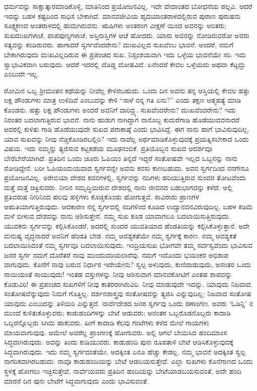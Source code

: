 ಧರ್ಮವನ್ನು ಸಾಕ್ಷಾತ್ಕಾರಮಾಡಿಕೊಳ್ಳಿ, ಮಾತಿನಿಂದ ಪ್ರಯೋಜನವಿಲ್ಲ. ಇದೇ ವೇದಾಂತದ ಬೋಧನೆಯ ಪಲ್ಲವಿ. ಆದರೆ ಇದನ್ನು ಬಹಳ ಕಷ್ಟದಿಂದ ಸಾಧಿಸ ಬೇಕಾಗಿದೆ. ಮಾನವಜೀವಿಯ ಹೃದಯಾಂತರಾಳದಲ್ಲಿರುವ ಪುರಾಣ ಪುರುಷನು ಸೂಕ್ಷ್ಮಕಣದ ಅಂತರಾಳದಲ್ಲಿ ಹುದುಗಿರುವನು. ಋಷಿಗಳು ಅಂತರಂಗ ವೀಕ್ಷಣೆ ಯಿಂದ ಅವನನ್ನು ಅರಿತರು; ಸುಖದುಃಖಗಳಾಚೆ, ಪಾಪಪುಣ್ಯಗಳಾಚೆ, ಅಸ್ತಿನಾಸ್ತಿಗಳ ಆಚೆ ಹೋದರು. ಯಾರು ಅವನನ್ನು ನೋಡಿರುವರೋ ಅವರು ಸತ್ಯವನ್ನು ಕಂಡಿರುವರು. ಹಾಗಾದರೆ ಸ್ವರ್ಗವೆಂದರೇನು? ದುಃಖವಿಲ್ಲದ ಸುಖವೆಂಬ ಭಾವನೆ. ಅಂದರೆ, ನಮಗೆ ಬೇಕಾಗಿರುವುದು ದುಃಖವಿಲ್ಲದಿರುವ ಈ ಪ್ರಪಂಚದ ಸುಖ. ನಿಸ್ಸಂಶಯವಾಗಿ ಇದು ಒಳ್ಳೆಯ ಭಾವನೆಯೇ ಸರಿ. ಇದು ಸ್ವಾಭಾವಿಕವಾಗಿ ಬರುವುದು. ಆದರೆ ಇದರಲ್ಲಿ ದೊಡ್ಡ ದೋಷವಿದೆ. ಏನೆಂದರೆ ಕೇವಲ ಒಳ್ಳೆಯದು ಅಥವಾ ಕೆಟ್ಟದ್ದು ಎಂಬುದೇ ಇಲ್ಲ.

ರೋಮಿನ ಒಬ್ಬ ಶ‍್ರೀಮಂತನ ಕಥೆಯನ್ನು ನೀವೆಲ್ಲ ಕೇಳಿರಬಹುದು. ಒಂದು ದಿನ ಅವನು ತನ್ನ ಆಸ್ತಿಯಲ್ಲಿ ಕೇವಲ ಹತ್ತು ಲಕ್ಷ ಪೌಂಡುಗಳು ಮಾತ್ರ ಉಳಿದಿವೆ ಎಂಬುದನ್ನು ಕೇಳಿ “ನಾಳೆ ನನ್ನ ಗತಿ ಏನು?” ಎಂದು ತಕ್ಷಣ ಆತ್ಮಹತ್ಯೆ ಮಾಡಿ ಕೊಂಡನು. ಹತ್ತು ಲಕ್ಷ ಪೌಂಡುಗಳು ಅಂದರೆ ಅವನಿಗೆ ದಾರಿದ್ರ್ಯ. ಸುಖವೆಂದರೇನು? ದುಃಖವೆಂದರೇನು? ಇದು ನಿರಂತರ ಬದಲಾಗುತ್ತಿರುವ ಭಾವನೆ. ನಾನು ಹುಡುಗ ನಾಗಿದ್ದಾಗ ನಾನೊಬ್ಬ ಕುದುರೆಗಾಡಿ ಹೊಡೆಯುವವನಾದರೆ ಅದರಲ್ಲಿ ಕುಳಿತು ಗಾಡಿ ಹೊಡೆಯುವುದೇ ಸುಖದ ಪರಾಕಾಷ್ಠೆ ಎಂದು ಭಾವಿಸಿದ್ದೆ. ಈಗ ನಾನು ಹಾಗೆ ಭಾವಿಸುವುದಿಲ್ಲ. ಯಾವ ಸುಖವನ್ನು ನೀವು ನೆಚ್ಚಿಕೊಂಡಿರಬಲ್ಲಿರಿ? ಇದು ನಾವೆಲ್ಲ ಅರ್ಥಮಾಡಿಕೊಳ್ಳುವುದಕ್ಕೆ ಪ್ರಯತ್ನಿಸಬೇಕಾದ ಒಂದು ವಿಷಯ. ಇದು ನಮ್ಮನ್ನು ತ್ಯಜಿಸುವ ಕಟ್ಟಕಡೆಯ ಮೂಢನಂಬಿಕೆ. ಪ್ರತಿಯೊಬ್ಬನ ಸುಖದ ಆದರ್ಶವೂ ಬೇರೆಬೇರೆಯಾಗಿದೆ. ಪ್ರತಿದಿನ ಒಂದು ಚೂರು ಓಪಿಯಂ ತಿನ್ನದೆ ಇದ್ದರೆ ಸಂತೋಷವೇ ಇಲ್ಲದ ಒಬ್ಬನನ್ನು ನಾನು ನೋಡಿದ್ದೇನೆ. ಬರೀ ಓಪಿಯಂಮಯವಾದ ಸ್ವರ್ಗವನ್ನೇ ಅವನು ಕನಸು ಕಾಣಬಹುದು. ಅವನ ಸ್ವರ್ಗದಿಂದ ನನಗೇನೂ ಪ್ರಯೋಜನವಿಲ್ಲ. ಅರೇಬಿಯಾ ದೇಶದ ಕವನಗಳಲ್ಲಿ, ಸ್ವರ್ಗವನ್ನು ನದಿಗಳು ಹರಿಯುತ್ತಿರುವ ಸುಂದರ ತೋಟವೆಂದು ಮತ್ತೆ ಮತ್ತೆ ಚಿತ್ರಿಸುವರು. ನೀರಿನ ಸಮೃದ್ಧಿಯಿರುವ ದೇಶದಲ್ಲಿ ನಾನು ಜೀವನದ ಬಹುಭಾಗವನ್ನು ಕಳೆದೆ. ಅಲ್ಲಿ ಪ್ರತಿವರುಷ ನೀರಿನಿಂದ ಹಲವು ಹಳ್ಳಿಗಳು ಕೊಚ್ಚಿಕೊಂಡು ಹೋಗುತ್ತವೆ. ಸಾವಿರಾರು ಪ್ರಾಣಗಳ ಆಹುತಿಯಾಗುತ್ತಿರುವುದು. ಆದಕಾರಣ ನನ್ನ ಸ್ವರ್ಗದಲ್ಲಿ ನದಿಗಳಿಂದ ಕೂಡಿದ ಉದ್ಯಾನವನವಿರುವುದಿಲ್ಲ. ಬಹಳ ಕಡಿಮೆ ಮಳೆ ಬೀಳುವ ದೇಶವನ್ನು ನಾನು ಆಶಿಸುತ್ತೇನೆ. ನಮ್ಮ ಸುಖ ಕೂಡ ಯಾವಾಗಲೂ ಬದಲಾಯಿಸುತ್ತಿರುವುದು. ಯುವಕನು ಸ್ವರ್ಗವನ್ನು ಕಲ್ಪಿಸಿಕೊಂಡರೆ, ಅದರಲ್ಲಿ ಸುಂದರ ಯುವತಿಯಾದ ಹೆಂಡತಿಯನ್ನು ಕಲ್ಪಿಸಿಕೊಳ್ಳುತ್ತಾನೆ. ಅದೇ ಮನುಷ್ಯ ವೃದ್ಧನಾದರೆ ಅವನಿಗೆ ಹೆಂಡತಿ ಬೇಡ. ನಮ್ಮ ಆವಶ್ಯಕತೆಯೇ ನಮ್ಮ ಸ್ವರ್ಗಕ್ಕೆ ಕಾರಣ. ನಮ್ಮ ಆವಶ್ಯಕತೆ ಬದಲಾಯಿಸಿದಂತೆ ನಮ್ಮ ಸ್ವರ್ಗವೂ ಬದಲಾಯಿಸುವುದು. ಇಂದ್ರಿಯಸುಖ ಭೋಗವೇ ತಮ್ಮ ಸರ್ವಸ್ವವೆಂದು ಭಾವಿಸುವ ಜನರ ಸ್ವರ್ಗ ನಮಗೆ ದೊರೆತರೆ ನಾವು ಮುಂದುವರಿಯಲಾರೆವು. ನಮಗೆ ಇದೊಂದು ಭಯಂಕರ ಅಭಿಶಾಪ ವಾಗುವುದು. ಕೊನೆಗೆ ನಾವು ಬರುವ ನಿರ್ಧಾರ ಇದೇಯೇನು? ಸ್ವಲ್ಪ ಅಳುವುದು, ಕುಣಿದಾಡುವುದು, ಅನಂತರ ಒಂದು ನಾಯಿಯಂತೆ ಸಾಯುವುದು! ಇಂತಹ ವಸ್ತುಗಳನ್ನು ನೀವು ಆಶಿಸುವಾಗ ಮಾನವಕೋಟಿಗೆ ಎಂತಹ ಶಾಪವನ್ನು ಕೊಡುವಿರಿ! ಈ ಪ್ರಪಂಚದ ಸುಖಗಳಿಗೆ ನೀವು ಕಾತರರಾಗಿರುವಿರಿ. ನೀವು ಮಾಡುವುದೇ ಇದನ್ನು. ಯಾವುದು ನಿಜವಾದ ಸಂತೋಷವೆನ್ನುವುದು ನಿಮಗೆ ಗೊತ್ತಿಲ್ಲ. ದರ್ಶನಶಾಸ್ತ್ರವು ಸಂತೋಷವನ್ನು ತ್ಯಜಿಸಿ ಎನ್ನುವುದಿಲ್ಲ; ನಿಜವಾದ ಸಂತೋಷ ಯಾವುದು ಎಂಬುದನ್ನು ತಿಳಿಯಿರಿ ಎನ್ನುತ್ತದೆ. ನಾರ್ವೆದೇಶದ ಜನರ ಸ್ವರ್ಗವು ಒಂದು ರಣಾಂಗಣ. ಅವರು ‘ಓಡಿನ್ನಿ’ ನ ಮುಂದೆ ಕುಳಿತುಕೊಳ್ಳುವರು; ಕಾಡುಹಂದಿಗಳನ್ನು ಬೇಟೆ ಆಡುವರು; ಅನಂತರ ಒಬ್ಬರೊಡನೊಬ್ಬರು ಕಾದಾಡಿ ಒಬ್ಬರನ್ನೊಬ್ಬರು ಸಿಗಿದು ಹಾಕುವರು. ಹೀಗೆ ಕಾದಾಡಿ ಕೆಲವು ಗಂಟೆಗಳು ಕಳೆದ ಮೇಲೆ ಗಾಯಗಳು ಮಾಯವಾಗುವುವು. ಆಮೇಲೆ ಅವರೆಲ್ಲ ಪ್ರಾಂಗಣಕ್ಕೆ ಹೋಗುವರು. ಅಲ್ಲಿ ಆಗಲೆ ಬೇಯಿಸಿದ ಹಂದಿಮಾಂಸ ಸಿದ್ಧವಾಗಿರುವುದು. ಅದನ್ನು ತಿಂದು ಕುಡಿಯುವರು. ಕಾಡುಹಂದಿ ಪುನಃ ರೂಪತಾಳಿ ಬೇಟೆ ಆಡಿಸಿಕೊಳ್ಳುವುದಕ್ಕೆ ಸಿದ್ಧವಾಗಿರುವುದು. ಇದು ನಮ್ಮ ಸ್ವರ್ಗದಂತೆಯೇ, ಅದಕ್ಕಿಂತ ಏನೂ ಹೆಚ್ಚು ಕೇಡಲ್ಲ. ನಮ್ಮ ಭಾವನೆ ಅದಕ್ಕಿಂತ ಸ್ವಲ್ಪ ನಾಗರಿಕವಾಗಿರಬಹುದು. ನಾವೂ ಕಾಡುಹಂದಿಯನ್ನು ಬೇಟೆ ಆಡಬಯಸುತ್ತೇವೆ. ಎಲ್ಲಾ ಸುಖಗಳು ಕೊನೆಗಾಣದ ಒಂದು ಸ್ಥಳಕ್ಕೆ ಹೋಗಲು ಇಚ್ಛಿಸುತ್ತೇವೆ, ನಾರ್ವೆಯವರು ಪ್ರತಿದಿನ ಹಂದಿಯನ್ನು ಬೇಟೆಯಾಡಬಯಸುವಂತೆ, ಅದೇ ಹಂದಿ ಮಾರನೆ ದಿನ ಪುನಃ ಬೇಟೆಗೆ ಸಿದ್ಧವಾಗುವುದು ಎಂದು ಭಾವಿಸುವಂತೆ.

